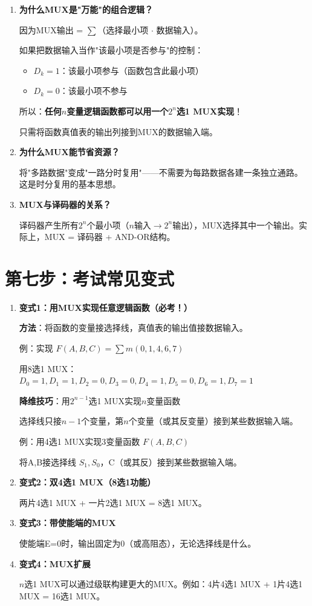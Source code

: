 \begin{enumerate}
  \item \textbf{为什么MUX是"万能"的组合逻辑？}

  因为MUX输出 = $\sum$（选择最小项 $\cdot$ 数据输入）。

  如果把数据输入当作"该最小项是否参与"的控制：
  \begin{itemize}
    \item $D_k = 1$：该最小项参与（函数包含此最小项）
    \item $D_k = 0$：该最小项不参与
  \end{itemize}

  所以：\textbf{任何$n$变量逻辑函数都可以用一个$2^n$选1 MUX实现}！

  只需将函数真值表的输出列接到MUX的数据输入端。

  \item \textbf{为什么MUX能节省资源？}

  将"多路数据"变成"一路分时复用"——不需要为每路数据各建一条独立通路。这是时分复用的基本思想。

  \item \textbf{MUX与译码器的关系？}

  译码器产生所有$2^n$个最小项（$n$输入$\to$$2^n$输出），MUX选择其中一个输出。实际上，MUX = 译码器 + AND-OR结构。
\end{enumerate}

\section{第七步：考试常见变式}

\begin{enumerate}
  \item \textbf{变式1：用MUX实现任意逻辑函数（必考！）}

  \textbf{方法}：将函数的变量接选择线，真值表的输出值接数据输入。

  例：实现 $F(A,B,C) = \sum m(0,1,4,6,7)$

  用8选1 MUX：$D_0=1, D_1=1, D_2=0, D_3=0, D_4=1, D_5=0, D_6=1, D_7=1$

  \textbf{降维技巧}：用$2^{n-1}$选1 MUX实现$n$变量函数

  选择线只接$n-1$个变量，第$n$个变量（或其反变量）接到某些数据输入端。

  例：用4选1 MUX实现3变量函数 $F(A,B,C)$

  将A,B接选择线 $S_1,S_0$，C（或其反）接到某些数据输入端。

  \item \textbf{变式2：双4选1 MUX（8选1功能）}

  两片4选1 MUX + 一片2选1 MUX = 8选1 MUX。

  \item \textbf{变式3：带使能端的MUX}

  使能端E=0时，输出固定为0（或高阻态），无论选择线是什么。

  \item \textbf{变式4：MUX扩展}

  $n$选1 MUX可以通过级联构建更大的MUX。例如：4片4选1 MUX + 1片4选1 MUX = 16选1 MUX。
\end{enumerate}

